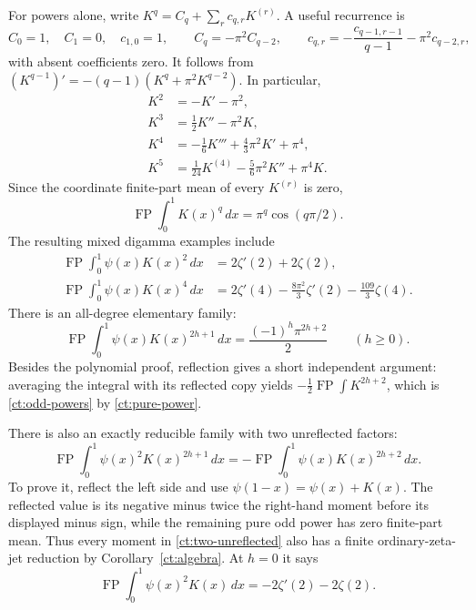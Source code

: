 \documentclass[11pt,a4paper]{article}
\numberwithin{equation}{section}
\theoremstyle{definition}
\theoremstyle{remark}
\begin{document}
For powers alone, write
$K^q=C_q+\sum_rc_{q,r}K^{(r)}$. A useful recurrence is
\[
 C_0=1,\quad C_1=0,\quad c_{1,0}=1,\qquad
 C_q=-\pi^2 C_{q-2},\qquad
 c_{q,r}=-\frac{c_{q-1,r-1}}{q-1}-\pi^2c_{q-2,r},
\]
with absent coefficients zero. It follows from
$(K^{q-1})'=-(q-1)(K^q+\pi^2K^{q-2})$.
In particular,
\begin{align*}
 K^2&=-K'-\pi^2,\\
 K^3&=\tfrac12K''-\pi^2K,\\
 K^4&=-\tfrac16K'''+\tfrac43\pi^2K'+\pi^4,\\
 K^5&=\tfrac1{24}K^{(4)}-\tfrac56\pi^2K''+\pi^4K.
\end{align*}
Since the coordinate finite-part mean of every $K^{(r)}$ is zero,
\begin{equation}\label{ct:pure-power}
 \operatorname{FP}\int_0^1K(x)^q\,dx
       =\pi^q\cos(q\pi/2).
\end{equation}
The resulting mixed digamma examples include
\begin{align}
 \operatorname{FP}\int_0^1\psi(x)K(x)^2\,dx
     &=2\zeta'(2)+2\zeta(2),\label{ct:cubic-reflected}\\
 \operatorname{FP}\int_0^1\psi(x)K(x)^4\,dx
     &=2\zeta'(4)-\frac{8\pi^2}{3}\zeta'(2)
                       -\frac{109}{3}\zeta(4).\label{ct:quintic-reflected}
\end{align}
There is an all-degree elementary family:
\begin{equation}\label{ct:odd-powers}
 \boxed{\displaystyle
 \operatorname{FP}\int_0^1\psi(x)K(x)^{2h+1}\,dx
       =\frac{(-1)^h\pi^{2h+2}}2\qquad(h\ge0).}
\end{equation}
Besides the polynomial proof, reflection gives a short independent
argument: averaging the integral with its reflected copy yields
$-\tfrac12\operatorname{FP}\int K^{2h+2}$, which is
\eqref{ct:odd-powers} by \eqref{ct:pure-power}.

There is also an exactly reducible family with two unreflected factors:
\begin{equation}\label{ct:two-unreflected}
 \operatorname{FP}\int_0^1\psi(x)^2K(x)^{2h+1}\,dx
   =-\operatorname{FP}\int_0^1\psi(x)K(x)^{2h+2}\,dx.
\end{equation}
To prove it, reflect the left side and use
$\psi(1-x)=\psi(x)+K(x)$. The reflected value is its negative minus
twice the right-hand moment before its displayed minus sign, while
the remaining pure odd power has zero finite-part mean. Thus every
moment in \eqref{ct:two-unreflected} also has a finite ordinary-zeta-jet
reduction by Corollary~\ref{ct:algebra}. At $h=0$ it says
\[
 \operatorname{FP}\int_0^1\psi(x)^2K(x)\,dx
       =-2\zeta'(2)-2\zeta(2).
\]
\end{document}
